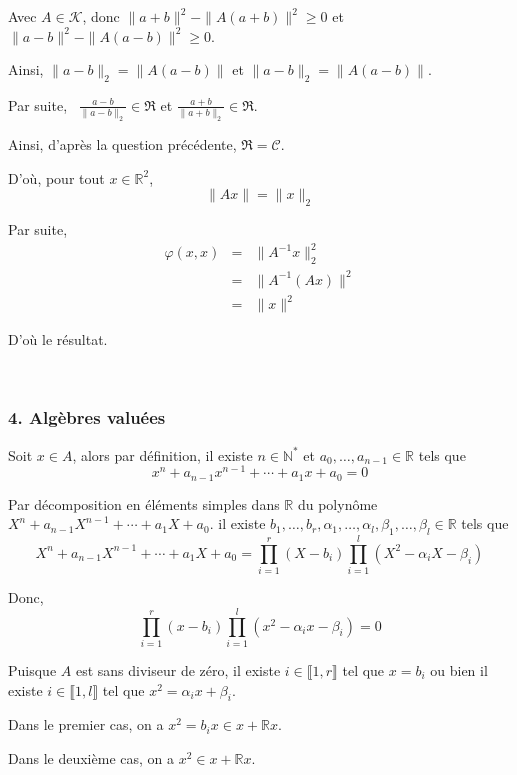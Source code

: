 Avec $A \in \mathcal{K}$, donc $\| a + b \|^2 - \| A (a + b) \|^2 \geqslant 0$
et $\| a - b \|^2 - \| A (a - b) \|^2 \geqslant 0$.

Ainsi, $\| a - b \| _2 = \| A (a - b) \| $ et $\| a - b \| _2 = \| A (a - b)
\| $.

Par suite, \ $ \frac{a - b}{\| a - b \| _2} \in \Re$ et $ \frac{a + b}{\| a +
b \| _2} \in \Re$.

Ainsi, d'apr{\`e}s la question pr{\'e}c{\'e}dente, $\Re =\mathcal{C}$.

D'o{\`u}, pour tout $x \in \mathbb{R}^2$,
\[ \| A x \| = \| x \|_2 \]


Par suite,
\begin{eqnarray*}
  \varphi (x, x) & = & \| A^{- 1} x \|_2^2\\
  & = & \| A^{- 1} (A x) \|^2\\
  & = & \| x \|^2
\end{eqnarray*}


D'o{\`u} le r{\'e}sultat.

\

\subsubsection*{4. Alg{\`e}bres valu{\'e}es}

 Soit $x \in A$, alors par d{\'e}finition, il existe $n \in
\mathbb{N}^{\ast}$ et $a_0, \ldots, a_{n - 1} \in \mathbb{R}$ tels que
\[ x^n + a_{n - 1} x^{n - 1} + \cdots + a_1 x + a_0 = 0 \]


Par d{\'e}composition en {\'e}l{\'e}ments simples dans $\mathbb{R}$ du
polyn{\^o}me $X^n + a_{n - 1} X^{n - 1} + \cdots + a_1 X + a_0$. il existe
$b_1, \ldots, b_r, \alpha_1, \ldots, \alpha_l, \beta_1, \ldots, \beta_l \in
\mathbb{R}$ tels que
\[ X^n + a_{n - 1} X^{n - 1} + \cdots + a_1 X + a_0 = \underset{i =
   1}{\overset{r}{\prod}} (X - b_i) \underset{i = 1}{\overset{l}{\prod}} (X^2
   - \alpha_i X - \beta_i) \]


Donc,
\[ \underset{i = 1}{\overset{r}{\prod}} (x - b_i) \underset{i =
   1}{\overset{l}{\prod}} (x^2 - \alpha_i x - \beta_i) = 0 \]


Puisque $A$ est sans diviseur de z{\'e}ro, il existe $i \in \llbracket 1, r
\rrbracket$ tel que $x = b_i$ ou bien il existe $i \in \llbracket 1, l
\rrbracket$ tel que $x^2 = \alpha_i x + \beta_i$.

Dans le premier cas, on a $x^2 = b_i x \in x +\mathbb{R}x$.

Dans le deuxi{\`e}me cas, on a $x^2 \in x +\mathbb{R}x$.

